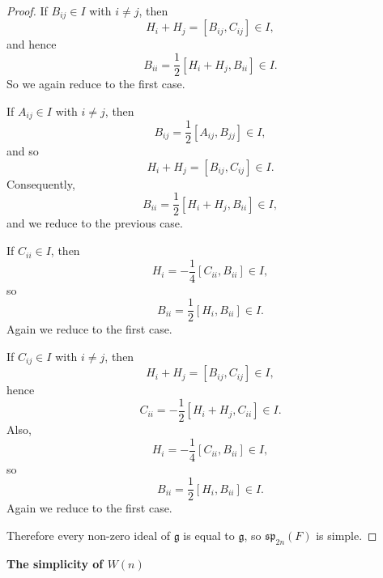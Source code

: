 \begin{proof}
    If $B_{ij}\in I$ with $i\neq j$, then
    \[
        H_i+H_j=[B_{ij},C_{ij}]\in I,
    \]
    and hence
    \[
        B_{ii}=\frac{1}{2}[H_i+H_j,B_{ii}]\in I.
    \]
    So we again reduce to the first case.

    If $A_{ij}\in I$ with $i\neq j$, then
    \[
        B_{ij}=\frac{1}{2}[A_{ij},B_{jj}]\in I,
    \]
    and so
    \[
        H_i+H_j=[B_{ij},C_{ij}]\in I.
    \]
    Consequently,
    \[
        B_{ii}=\frac{1}{2}[H_i+H_j,B_{ii}]\in I,
    \]
    and we reduce to the previous case.

    If $C_{ii}\in I$, then
    \[
        H_i=-\frac{1}{4}[C_{ii},B_{ii}]\in I,
    \]
    so
    \[
        B_{ii}=\frac{1}{2}[H_i,B_{ii}]\in I.
    \]
    Again we reduce to the first case.

    If $C_{ij}\in I$ with $i\neq j$, then
    \[
        H_i+H_j=[B_{ij},C_{ij}]\in I,
    \]
    hence
    \[
        C_{ii}=-\frac{1}{2}[H_i+H_j,C_{ii}]\in I.
    \]
    Also,
    \[
        H_i=-\frac{1}{4}[C_{ii},B_{ii}]\in I,
    \]
    so
    \[
        B_{ii}=\frac{1}{2}[H_i,B_{ii}]\in I.
    \]
    Again we reduce to the first case.

    Therefore every non-zero ideal of $\mathfrak{g}$ is equal to $\mathfrak{g}$, so $\mathfrak{sp}_{2n}(F)$ is simple.
\end{proof}

\textbf{The simplicity of $W(n)$}

